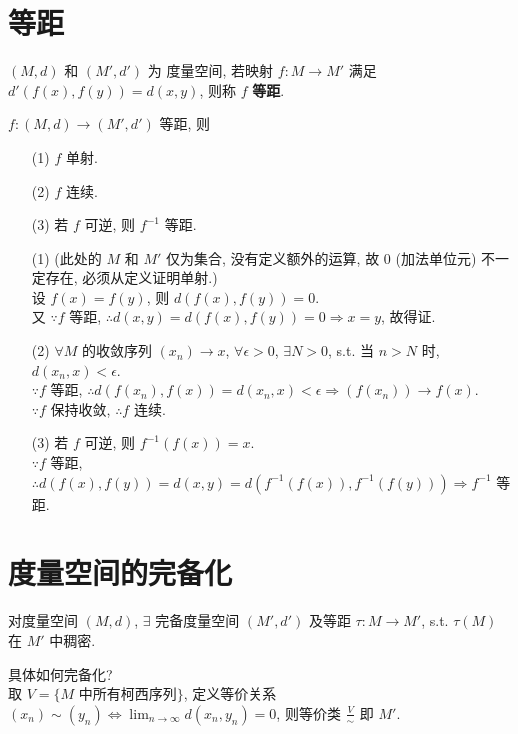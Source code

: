 \documentclass{note}
\begin{document}
\section{等距}
\begin{df}[等距]
    $(M,d)$ 和 $(M',d')$ 为 度量空间, 若映射 $f:M\rightarrow M'$ 满足 $d'(f(x),f(y))=d(x,y)$, 则称 $f$ \textbf{等距}.
\end{df}

\begin{thm}
    $f:(M,d)\rightarrow(M',d')$ 等距, 则
    \begin{itemize}
        \item[(1)] $f$ 单射.
        \item[(2)] $f$ 连续.
        \item[(3)] 若 $f$ 可逆, 则 $f^{-1}$ 等距.
    \end{itemize}
\end{thm}
\begin{pf}
    \begin{itemize}
        \item[(1)] (此处的 $M$ 和 $M'$ 仅为集合, 没有定义额外的运算, 故 $0$ (加法单位元) 不一定存在, 必须从定义证明单射.)\\
        设 $f(x)=f(y)$, 则 $d(f(x),f(y))=0$.\\
        又 $\because f$ 等距, $\therefore d(x,y)=d(f(x),f(y))=0\Longrightarrow x=y$, 故得证.
        \item[(2)] $\forall M$ 的收敛序列 $(x_n)\rightarrow x$, $\forall\epsilon>0$, $\exists N>0$, s.t. 当 $n>N$ 时, $d(x_n,x)<\epsilon$.\\
        $\because f$ 等距, $\therefore d(f(x_n),f(x))=d(x_n,x)<\epsilon\Longrightarrow(f(x_n))\rightarrow f(x)$.\\
        $\because f$ 保持收敛, $\therefore f$ 连续.
        \item[(3)] 若 $f$ 可逆, 则 $f^{-1}(f(x))=x$.\\
        $\because f$ 等距, $\therefore d(f(x),f(y))=d(x,y)=d(f^{-1}(f(x)),f^{-1}(f(y)))\Longrightarrow f^{-1}$ 等距.
    \end{itemize}
\end{pf}

\section{度量空间的完备化}
\begin{thm}
    对度量空间 $(M,d)$, $\exists$ 完备度量空间 $(M',d')$ 及等距 $\tau:M\rightarrow M'$, s.t. $\tau(M)$ 在 $M'$ 中稠密.
\end{thm}

具体如何完备化?\\
取 $V=\{M\text{ 中所有柯西序列}\}$, 定义等价关系 $(x_n)\sim(y_n)\Longleftrightarrow\lim_{n\rightarrow\infty}d(x_n,y_n)=0$, 则等价类 $\frac{V}{\sim}$ 即 $M'$.
\ifx\allfiles\undefined
\end{document}
